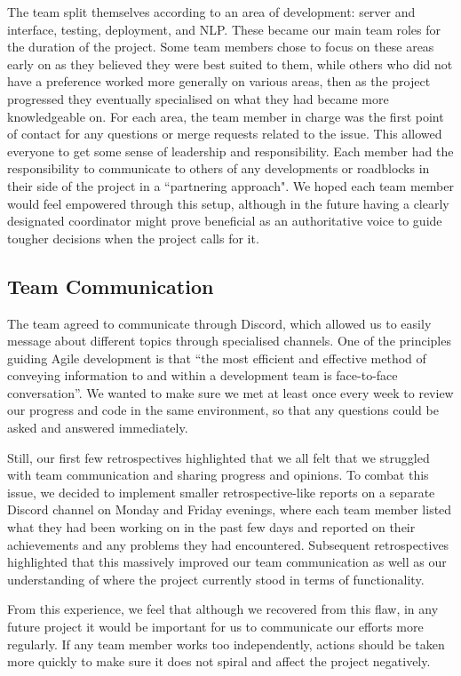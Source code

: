 \documentclass{l3proj}
\begin{document}
The team split themselves according to an area of development: server and interface, testing, deployment, and NLP. These became our main team roles for the duration of the project. Some team members chose to focus on these areas early on as they believed they were best suited to them, while others who did not have a preference worked more generally on various areas, then as the project progressed they eventually specialised on what they had became more knowledgeable on. For each area, the team member in charge was the first point of contact for any questions or merge requests related to the issue. This allowed everyone to get some sense of leadership and responsibility. Each member had the responsibility to communicate to others of any developments or roadblocks in their side of the project in a ``partnering approach"\cite{leadership:Farley}. We hoped each team member would feel empowered through this setup, although in the future having a clearly designated coordinator might prove beneficial as an authoritative voice to guide tougher decisions when the project calls for it.

\subsection{Team Communication}
The team agreed to communicate through Discord, which allowed us to easily message about different topics through specialised channels. One of the principles guiding Agile development is that “the most efficient and effective method of conveying information to and within a development team is face-to-face conversation”\cite{agilemanifesto}. We wanted to make sure we met at least once every week to review our progress and code in the same environment, so that any questions could be asked and answered immediately.

Still, our first few retrospectives highlighted that we all felt that we struggled with team communication and sharing progress and opinions. To combat this issue, we decided to implement smaller retrospective-like reports on a separate Discord channel on Monday and Friday evenings, where each team member listed what they had been working on in the past few days and reported on their achievements and any problems they had encountered. Subsequent retrospectives highlighted that this massively improved our team communication as well as our understanding of where the project currently stood in terms of functionality.

From this experience, we feel that although we recovered from this flaw, in any future project it would be important for us to communicate our efforts more regularly. If any team member works too independently, actions should be taken more quickly to make sure it does not spiral and affect the project negatively.
\end{document}
